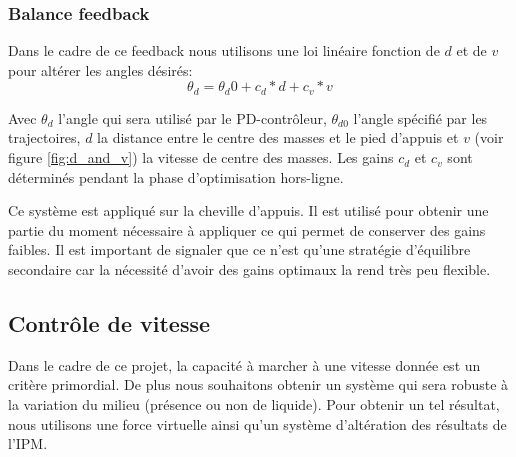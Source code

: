 \documentclass{llncs}
\begin{document}
%
\subsubsection{Balance feedback}
%
Dans le cadre de ce feedback nous utilisons une loi linéaire fonction de \(d\) et de \(v\) pour altérer les angles désirés:
\[
\theta_d=\theta_d0 + c_d*d + c_v*v 
\]

Avec \(\theta_d\) l'angle qui sera utilisé par le PD-contrôleur, \(\theta_{d0}\) l'angle spécifié par les trajectoires, \(d\) la distance entre le centre des masses et le pied d'appuis et \(v\) (voir figure \ref{fig:d_and_v}) la vitesse de centre des masses.
Les gains \(c_d\) et \(c_v\) sont déterminés pendant la phase d'optimisation hors-ligne. 

Ce système est appliqué sur la cheville d'appuis. Il est utilisé pour obtenir une partie du moment nécessaire à appliquer ce qui permet de conserver des gains faibles. Il est important de signaler que ce n'est qu'une stratégie d'équilibre secondaire car la nécessité d'avoir des gains optimaux la rend très peu flexible. 
%
\subsection{Contrôle de vitesse}
%
\label{sec:speed_control}
Dans le cadre de ce projet, la capacité à marcher à une vitesse donnée est un critère primordial. De plus nous souhaitons obtenir un système qui sera robuste à la variation du milieu (présence ou non de liquide). Pour obtenir un tel résultat, nous utilisons une force virtuelle ainsi qu'un système d'altération des résultats de l'IPM.
%
\end{document}
